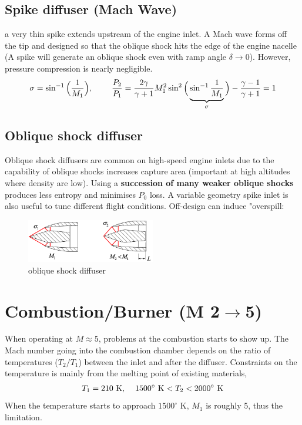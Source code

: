 \documentclass[a4paper,10pt]{article}
\begin{document}
\subsection{Spike diffuser (Mach Wave)}
a very thin spike extends upstream of the engine inlet. A Mach wave forms off the tip and designed so that the oblique shock hits the edge of the engine nacelle (A spike will generate an oblique shock even with ramp angle $\delta\rightarrow0$). However, pressure compression is nearly negligible.
\begin{gather*}
    \sigma = \sin^{-1}\Big(\frac{1}{M_1}\Big),\hspace*{0.8cm}\frac{P_2}{P_1}=\frac{2\gamma}{\gamma+1}M_1^2\sin^2\Big(\underbrace{\sin^{-1}\frac{1}{M_1}}_\sigma\Big)-\frac{\gamma-1}{\gamma+1} = 1
\end{gather*}

\subsection{Oblique shock diffuser}
Oblique shock diffusers are common on high-speed engine inlets due to the capability of oblique shocks increases capture area (important at high altitudes where density are low). Using a \textbf{succession of many weaker oblique shocks} produces less entropy and minimises $P_0$ loss. A variable geometry spike inlet is also useful to tune different flight conditions. Off-design can induce "overspill:

\begin{figure}[H]
    \centering
    \includegraphics[width=0.5\textwidth]{Figure/os_diffuser.png}
    \caption{oblique shock diffuser}
    \label{fig:os_diffuser}
\end{figure}


\newpage
\section{Combustion/Burner (M 2$\rightarrow$5)}
When operating at $M\approx5$, problems at the combustion starts to show up. The Mach number going into the combustion chamber depends on the ratio of temperatures ($T_2/T_1$) between the inlet and after the diffuser. Constraints on the temperature is mainly from the melting point of existing materials,
\begin{gather*}
    T_1 = 210\text{ K},\hspace*{0.4cm}1500^{\circ}\text{ K}<T_2<2000^{\circ}\text{ K}
\end{gather*}
When the temperature starts to approach $1500^{\circ}$ K, $M_1$ is roughly 5, thus the limitation. 
\end{document}
